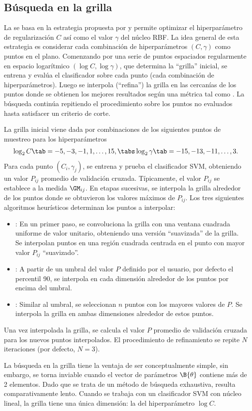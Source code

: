 %
%
\subsection{Búsqueda en la grilla}
%
La  se basa en la estrategia propuesta por
\cite{hsu} y permite optimizar el hiperparámetro de regularización $C$
así como el valor $\gamma$ del núcleo RBF.
La idea general de esta estrategia es considerar cada combinación de
hiperparámetros $(C,\gamma)$ como puntos en el plano.
Comenzando por una serie de puntos espaciados regularmente
en espacio logarítmico $(\log C,\log\gamma)$, que determina la
``grilla'' inicial, se entrena y evalúa el clasificador sobre cada
punto (cada combinación de hiperparámetros).
Luego se interpola (``refina'') la grilla en las cercanías de los
puntos donde se obtienen los mejores resultados según una métrica tal
como \GM.
La búsqueda continúa repitiendo el procedimiento sobre los puntos no
evaluados hasta satisfacer un criterio de corte.

La grilla inicial viene dada por combinaciones de los siguientes
puntos de muestreo para los hiperparámetros
%
\begin{align}
  \label{initial-grid}
  \log_2 C     \tab= -5, -3, -1, 1, \ldots, 15, \tabs
  \log_2\gamma \tab= -15,-13, -11, \ldots, 3.
\end{align}
%
Para cada punto $(C_i,\gamma_j)$, se entrena y prueba el clasificador
SVM, obteniendo un valor $P_{ij}$ promedio de validación cruzada.
Típicamente, el valor $P_{ij}$ se establece a la medida $\GM_{ij}$.
En etapas sucesivas, se interpola la grilla alrededor de los puntos
donde se obtuvieron los valores máximos de $P_{ij}$.
Los tres siguientes algoritmos heurísticos determinan los puntos a
interpolar:
%
\begin{itemize}
\item
  : En un primer paso, se convoluciona la grilla con una
  ventana cuadrada uniforme de valor unitario, obteniendo una versión
  ``suavizada'' de la grilla.  Se interpolan puntos en una región
  cuadrada centrada en el punto con mayor valor $P_{ij}$
  ``suavizado''.
\item
  : A partir de un umbral del valor $P$ definido por el
  usuario, por defecto el percentil 90, se interpola en cada dimensión
  alrededor de los puntos por encima del umbral.
\item
  : Similar al umbral, se seleccionan $n$ puntos
  con los mayores valores de $P$.
  Se interpola la grilla en ambas dimensiones alrededor de estos
  puntos.
\end{itemize}
%
Una vez interpolada la grilla, se calcula el valor $P$ promedio de
validación cruzada para los nuevos puntos interpolados.
El procedimiento de refinamiento se repite $N$ iteraciones (por
defecto, $N=3$).

La búsqueda en la grilla tiene la ventaja de ser conceptualmente
simple, sin embargo, se torna inviable cuando el vector de parámetros
$\B{\theta}$ contiene más de 2 elementos.
Dado que se trata de un método de búsqueda exhaustiva, resulta
comparativamente lento.
Cuando se trabaja con un clasificador SVM con núcleo lineal, la grilla
tiene una única dimensión: la del hiperparámetro $\log C$.
